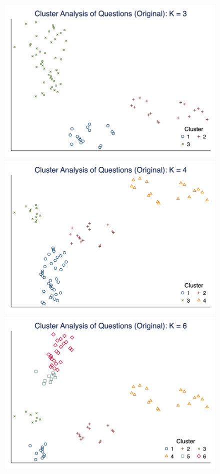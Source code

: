 \documentclass[10pt,leqno]{article}
\begin{document}
\begin{figure}  [h!]
\begin{center}
\includegraphics[scale=0.15]{CA_QuestionK3_ORI.png}
\includegraphics[scale=0.15]{CA_QuestionK4_ORI.png}
\includegraphics[scale=0.15]{CA_QuestionK6_ORI.png}

\end{center}
\end{figure}
\end{document}
